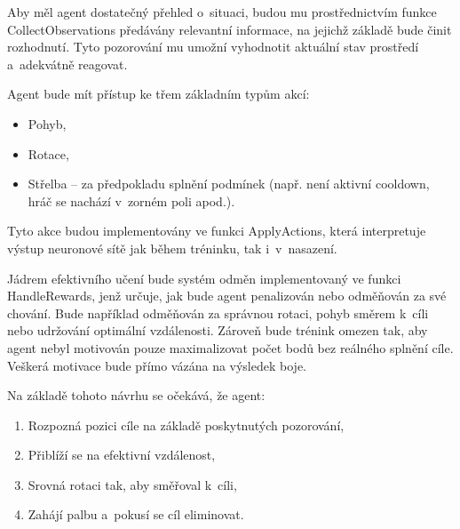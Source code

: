 Aby měl agent dostatečný přehled o~situaci, budou mu prostřednictvím funkce CollectObservations předávány relevantní informace, na jejichž základě bude činit rozhodnutí. Tyto pozorování mu umožní vyhodnotit aktuální stav prostředí a~adekvátně reagovat.

\newpage

Agent bude mít přístup ke třem základním typům akcí:
\begin{itemize}
\item Pohyb,
\item Rotace,
\item Střelba – za předpokladu splnění podmínek (např. není aktivní cooldown, hráč se nachází v~zorném poli apod.).
\end{itemize}

Tyto akce budou implementovány ve funkci ApplyActions, která interpretuje výstup neuronové sítě jak během tréninku, tak i~v~nasazení.

Jádrem efektivního učení bude systém odměn implementovaný ve funkci HandleRewards, jenž určuje, jak bude agent penalizován nebo odměňován za své chování. Bude například odměňován za správnou rotaci, pohyb směrem k~cíli nebo udržování optimální vzdálenosti. Zároveň bude trénink omezen tak, aby agent nebyl motivován pouze maximalizovat počet bodů bez reálného splnění cíle. Veškerá motivace bude přímo vázána na výsledek boje.

Na základě tohoto návrhu se očekává, že agent:
\begin{enumerate}
\item Rozpozná pozici cíle na základě poskytnutých pozorování,
\item Přiblíží se na efektivní vzdálenost,
\item Srovná rotaci tak, aby směřoval k~cíli,
\item Zahájí palbu a~pokusí se cíl eliminovat.
\end{enumerate}
